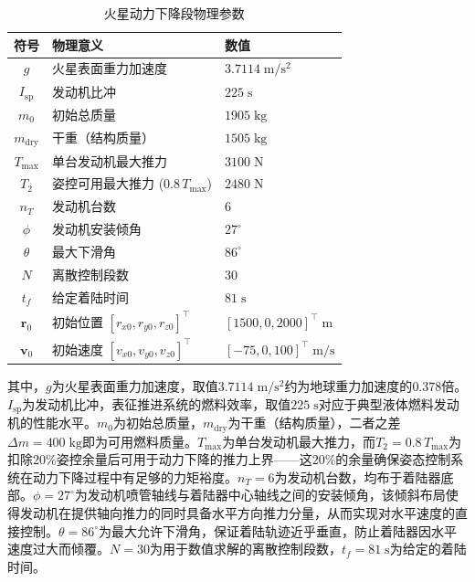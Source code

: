 \begin{table}[H]
    \centering
    \caption{火星动力下降段物理参数}
    \label{tab:params}
    \begin{tabular}{cll}
        \toprule
        符号 & 物理意义 & 数值 \\
        \midrule
        $g$          & 火星表面重力加速度                      & $3.7114\;\mathrm{m/s^2}$ \\
        $I_{\mathrm{sp}}$ & 发动机比冲                      & $225\;\mathrm{s}$ \\
        $m_0$        & 初始总质量                              & $1905\;\mathrm{kg}$ \\
        $m_{\mathrm{dry}}$ & 干重（结构质量）                  & $1505\;\mathrm{kg}$ \\
        $T_{\max}$   & 单台发动机最大推力                        & $3100\;\mathrm{N}$ \\
        $T_2$        & 姿控可用最大推力 ($0.8\,T_{\max}$)       & $2480\;\mathrm{N}$ \\
        $n_T$        & 发动机台数                              & $6$ \\
        $\phi$       & 发动机安装倾角                            & $27^\circ$ \\
        $\theta$     & 最大下滑角                              & $86^\circ$ \\
        $N$          & 离散控制段数                            & $30$ \\
        $t_f$        & 给定着陆时间                            & $81\;\mathrm{s}$ \\
        $\bm{r}_0$   & 初始位置 $[r_{x0}, r_{y0}, r_{z0}]^{\top}$ & $[1500, 0, 2000]^{\top}\;\mathrm{m}$ \\
        $\bm{v}_0$   & 初始速度 $[v_{x0}, v_{y0}, v_{z0}]^{\top}$ & $[-75, 0, 100]^{\top}\;\mathrm{m/s}$ \\
        \bottomrule
    \end{tabular}
\end{table}

其中，$g$为火星表面重力加速度，取值$3.7114\;\mathrm{m/s^2}$约为地球重力加速度的$0.378$倍。$I_{\mathrm{sp}}$为发动机比冲，表征推进系统的燃料效率，取值$225\;\mathrm{s}$对应于典型液体燃料发动机的性能水平。$m_0$为初始总质量，$m_{\mathrm{dry}}$为干重（结构质量），二者之差$\Delta m = 400\;\mathrm{kg}$即为可用燃料质量。$T_{\max}$为单台发动机最大推力，而$T_2 = 0.8\,T_{\max}$为扣除$20\%$姿控余量后可用于动力下降的推力上界——这$20\%$的余量确保姿态控制系统在动力下降过程中有足够的力矩裕度。$n_T = 6$为发动机台数，均布于着陆器底部。$\phi = 27^\circ$为发动机喷管轴线与着陆器中心轴线之间的安装倾角，该倾斜布局使得发动机在提供轴向推力的同时具备水平方向推力分量，从而实现对水平速度的直接控制。$\theta = 86^\circ$为最大允许下滑角，保证着陆轨迹近乎垂直，防止着陆器因水平速度过大而倾覆。$N = 30$为用于数值求解的离散控制段数，$t_f = 81\;\mathrm{s}$为给定的着陆时间。

